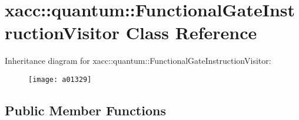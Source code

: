 \hypertarget{a01329}{}\section{xacc\+:\+:quantum\+:\+:Functional\+Gate\+Instruction\+Visitor Class Reference}
\label{a01329}
Inheritance diagram for xacc\+:\+:quantum\+:\+:Functional\+Gate\+Instruction\+Visitor\+:\begin{figure}[H]
\begin{center}
\leavevmode
\texttt{[image: a01329]}
\end{center}
\end{figure}
\subsection*{Public Member Functions}

